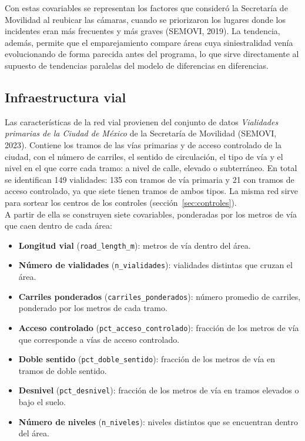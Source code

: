 Con estas covariables se representan los factores que consideró la Secretaría de Movilidad al reubicar las cámaras, cuando se priorizaron los lugares donde los incidentes eran más frecuentes y más graves (SEMOVI, 2019). La tendencia, además, permite que el emparejamiento compare áreas cuya siniestralidad venía evolucionando de forma parecida antes del programa, lo que sirve directamente al supuesto de tendencias paralelas del modelo de diferencias en diferencias.

\subsection{Infraestructura vial}

\noindent Las características de la red vial provienen del conjunto de datos \emph{Vialidades primarias de la Ciudad de México} de la Secretaría de Movilidad (SEMOVI, 2023). Contiene los tramos de las vías primarias y de acceso controlado de la ciudad, con el número de carriles, el sentido de circulación, el tipo de vía y el nivel en el que corre cada tramo: a nivel de calle, elevado o subterráneo. En total se identifican 149 vialidades: 135 con tramos de vía primaria y 21 con tramos de acceso controlado, ya que siete tienen tramos de ambos tipos. La misma red sirve para sortear los centros de los controles (sección~\ref{sec:controles}).\\

A partir de ella se construyen siete covariables, ponderadas por los metros de vía que caen dentro de cada área:

\begin{itemize}
    \item \textbf{Longitud vial} (\texttt{road\_length\_m}): metros de vía dentro del área.
    \item \textbf{Número de vialidades} (\texttt{n\_vialidades}): vialidades distintas que cruzan el área.
    \item \textbf{Carriles ponderados} (\texttt{carriles\_ponderados}): número promedio de carriles, ponderado por los metros de cada tramo.
    \item \textbf{Acceso controlado} (\texttt{pct\_acceso\_controlado}): fracción de los metros de vía que corresponde a vías de acceso controlado.
    \item \textbf{Doble sentido} (\texttt{pct\_doble\_sentido}): fracción de los metros de vía en tramos de doble sentido.
    \item \textbf{Desnivel} (\texttt{pct\_desnivel}): fracción de los metros de vía en tramos elevados o bajo el suelo.
    \item \textbf{Número de niveles} (\texttt{n\_niveles}): niveles distintos que se encuentran dentro del área.
\end{itemize}

